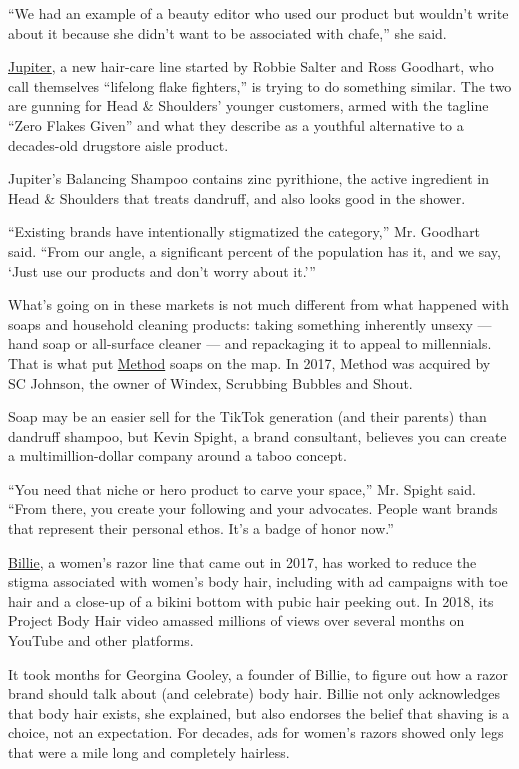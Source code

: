 ``We had an example of a beauty editor who used our product but wouldn't
write about it because she didn't want to be associated with chafe,''
she said.

\href{https://hellojupiter.com/}{Jupiter}, a new hair-care line started
by Robbie Salter and Ross Goodhart, who call themselves ``lifelong flake
fighters,'' is trying to do something similar. The two are gunning for
Head \& Shoulders' younger customers, armed with the tagline ``Zero
Flakes Given'' and what they describe as a youthful alternative to a
decades-old drugstore aisle product.

Jupiter's Balancing Shampoo contains zinc pyrithione, the active
ingredient in Head \& Shoulders that treats dandruff, and also looks
good in the shower.

``Existing brands have intentionally stigmatized the category,'' Mr.
Goodhart said. ``From our angle, a significant percent of the population
has it, and we say, `Just use our products and don't worry about it.'''

What's going on in these markets is not much different from what
happened with soaps and household cleaning products: taking something
inherently unsexy --- hand soap or all-surface cleaner --- and
repackaging it to appeal to millennials. That is what put
\href{https://methodhome.com/}{Method} soaps on the map. In 2017, Method
was acquired by SC Johnson, the owner of Windex, Scrubbing Bubbles and
Shout.

Soap may be an easier sell for the TikTok generation (and their parents)
than dandruff shampoo, but Kevin Spight, a brand consultant, believes
you can create a multimillion-dollar company around a taboo concept. ­­­

``You need that niche or hero product to carve your space,'' Mr. Spight
said. ``From there, you create your following and your advocates. People
want brands that represent their personal ethos. It's a badge of honor
now.''

\href{https://mybillie.com/}{Billie}, a women's razor line that came out
in 2017, has worked to reduce the stigma associated with women's body
hair, including with ad campaigns with toe hair and a close-up of a
bikini bottom with pubic hair peeking out. In 2018, its Project Body
Hair video amassed millions of views over several months on YouTube and
other platforms.

It took months for Georgina Gooley, a founder of Billie, to figure out
how a razor brand should talk about (and celebrate) body hair. Billie
not only acknowledges that body hair exists, she explained, but also
endorses the belief that shaving is a choice, not an expectation. For
decades, ads for women's razors showed only legs that were a mile long
and completely hairless.

